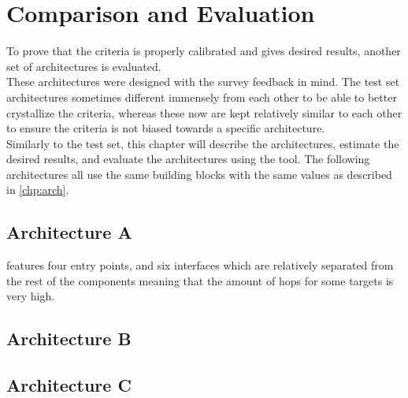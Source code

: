 \chapter{Comparison and Evaluation}
\label{chp:compeval}

To prove that the criteria is properly calibrated and gives desired results, another set of architectures is evaluated.\\
These architectures were designed with the survey feedback in mind.
The test set architectures sometimes different immensely from each other to be able to better crystallize the criteria,
whereas these now are kept relatively similar to each other to ensure the criteria is not biased towards a specific architecture.\\
Similarly to the test set, this chapter will describe the architectures, estimate the desired results, and evaluate the architectures using the tool.
The following architectures all use the same building blocks with the same values as described in \ref{chp:arch}.

\section{Architecture A}
\label{sec:archa}

 features four entry points, and six interfaces which are relatively separated from the rest of the components 
meaning that the amount of hops for some targets is very high. 


\section{Architecture B}
\label{sec:archb}



\section{Architecture C}
\label{sec:archc}

